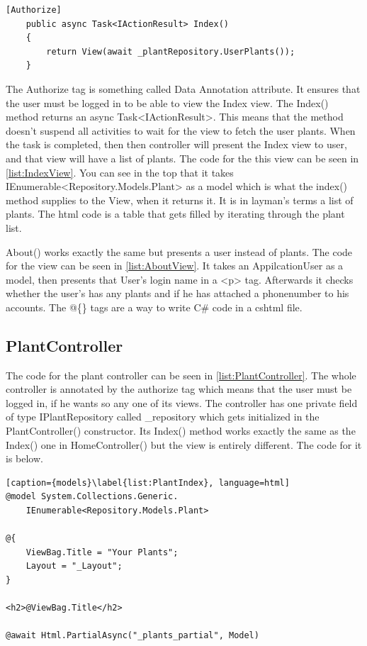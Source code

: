 \documentclass[a4paper,12pt,twoside,openright,titlepage]{book}
\begin{document}
\begin{center}
\begin{lstlisting}[caption={Dependency Injection}, language=CSharp]
	[Authorize]
    public async Task<IActionResult> Index()
	{            
        return View(await _plantRepository.UserPlants());
	}
\end{lstlisting}
\end{center} 
The Authorize tag is something called Data Annotation attribute. It ensures that the user must be logged in to be able to view the Index view. The Index() method returns an async Task<IActionResult>. This means that the method doesn't suspend all activities to wait for the view to fetch the user plants. When the task is completed, then then controller will present the Index view to user, and that view will have a list of plants. The code for the this view can be seen in \ref{list:IndexView}. You can see in the top that it takes IEnumerable<Repository.Models.Plant> as a model which is what the index() method supplies to the View, when it returns it. It is in layman's terms a list of plants. The html code is a table that gets filled by iterating through the plant list.

About() works exactly the same but presents a user instead of plants. The code for the view can be seen in \ref{list:AboutView}. It takes an AppilcationUser as a model, then presents that User's login name in a <p> tag. Afterwards it checks whether the user's has any plants and if he has attached a phonenumber to his accounts. The @\{\} tags are a way to write C\# code in a cshtml file.


\subsection{PlantController}
The code for the plant controller can be seen in \ref{list:PlantController}. The whole controller is annotated by the authorize tag which means that the user must be logged in, if he wants so any one of its views. The controller has one private field of type IPlantRepository called \_repository which gets initialized in the PlantController() constructor. Its Index() method works exactly the same as the Index() one in HomeController() but the view is entirely different. The code for it is below.

\begin{center}
\begin{lstlisting}[caption={models}\label{list:PlantIndex}, language=html]
@model System.Collections.Generic.
	IEnumerable<Repository.Models.Plant>

@{
    ViewBag.Title = "Your Plants";
    Layout = "_Layout";
}

<h2>@ViewBag.Title</h2>

@await Html.PartialAsync("_plants_partial", Model)
\end{lstlisting}
\end{center} 
\end{document}
